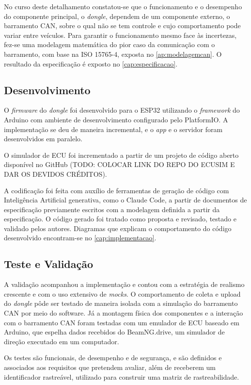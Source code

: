 No curso deste detalhamento constatou-se que o funcionamento e o desempenho do componente principal, o \textit{dongle}, dependem de um componente externo, o barramento CAN, sobre o qual não se tem controle e cujo comportamento pode variar entre veículos. Para garantir o funcionamento mesmo face às incertezas, fez-se uma modelagem matemática do pior caso da comunicação com o barramento, com base na ISO 15765-4, exposta no \autoref{ap:modelagemcan}. O resultado da especificação é exposto no \autoref{cap:especificacao}.

\subsection{Desenvolvimento}

O \textit{firmware} do \textit{dongle} foi desenvolvido para o ESP32 utilizando o \textit{framework} do Arduino com ambiente de desenvolvimento configurado pelo PlatformIO. A implementação se deu de maneira incremental, e o \textit{app} e o servidor foram desenvolvidos em paralelo.

O simulador de ECU foi incrementado a partir de um projeto de código aberto disponível no GitHub (TODO: COLOCAR LINK DO REPO DO ECUSIM E DAR OS DEVIDOS CRÉDITOS).

A codificação foi feita com auxílio de ferramentas de geração de código com Inteligência Artificial generativa, como o Claude Code, a partir de documentos de especificação previamente escritos com a modelagem definida a partir da especificação. O código gerado foi tratado como proposta e revisado, testado e validado pelos autores. Diagramas que explicam o comportamento do código desenvolvido encontram-se no \autoref{cap:implementacao}.

\subsection{Teste e Validação}

A validação acompanhou a implementação e contou com a estratégia de realismo crescente e com o uso extensivo de \textit{mocks}. O comportamento de coleta e upload do \textit{dongle} pôde ser testado de maneira isolada com a simulação do barramento CAN por meio do software. Já a montagem física dos componentes e a interação com o barramento CAN foram testadas com um emulador de ECU baseado em Arduino, que espelha dados recebidos do BeamNG.drive, um simulador de direção executado em um computador. 

Os testes são funcionais, de desempenho e de segurança, e são definidos e associados aos requisitos que pretendem avaliar, além de receberem um identificador rastreável, utilizado para construir uma matriz de rastreabilidade. 

